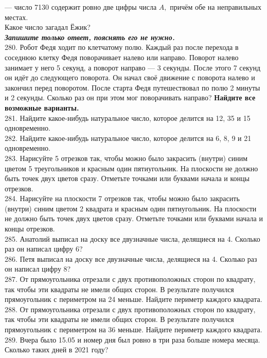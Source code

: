 \documentclass[12pt]{article}
\begin{document}
 --- число 7130 содержит ровно две цифры числа $A,$ причём обе на неправильных местах.\\
 Какое число загадал Ёжик?\\
  {\it {\textbf {Запишите только ответ, пояснять его не нужно.}}}\\
280. Робот Федя ходит по клетчатому полю. Каждый раз после перехода в соседнюю клетку Федя поворачивает налево или направо. Поворот налево занимает у него 5 секунд, а поворот направо --- 3 секунды. После этого 7 секунд он идёт до следующего поворота. Он начал своё движение с поворота налево и закончил перед поворотом. После старта Федя путешествовал по полю 2 минуты и 2 секунды. Сколько раз он при этом мог поворачивать направо? {\textbf {Найдите все возможные варианты.}}\\
281. Найдите какое-нибудь натуральное число, которое делится на 12, 35 и 15 одновременно.\\
282. Найдите какое-нибудь натуральное число, которое делится на 6, 8, 9 и 21 одновременно.\\
283. Нарисуйте 5 отрезков так, чтобы можно было закрасить (внутри) синим цветом 5 треугольников и красным один пятиугольник. На плоскости не должно быть точек двух цветов сразу. Отметьте точками или буквами начала и концы отрезков.\\
284. Нарисуйте на плоскости 7 отрезков так, чтобы можно было закрасить (внутри) синим цветом 2 квадрата и красным один пятиугольник. На плоскости не должно быть точек двух цветов сразу. Отметьте точками или буквами начала и концы отрезков.\\
285. Анатолий выписал на доску все двузначные числа, делящиеся на 4. Сколько раз он написал цифру 6?\\
286. Петя выписал на доску все двузначные числа, делящиеся на 4. Сколько раз он написал цифру 8?\\
287. От прямоугольника отрезали с двух противоположных сторон по квадрату, так чтобы эти квадраты не имели общих сторон. В результате получился прямоугольник с периметром на 24 меньше. Найдите периметр каждого квадрата.\\
288. От прямоугольника отрезали с двух противоположных сторон по квадрату, так чтобы эти квадраты не имели общих сторон. В результате получился прямоугольник с периметром на 36 меньше. Найдите периметр каждого квадрата.\\
289. Вчера было 15.05 и номер дня был ровно в три раза больше номера месяца. Сколько таких дней в 2021 году?\\
\end{document}
